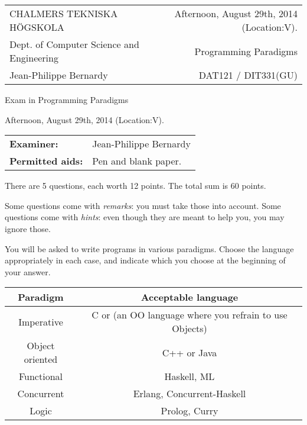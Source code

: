\documentclass{article}
\begin{document}
\setlength{\parskip}{2pt}

\newcommand{\examtime}{Afternoon, August 29th, 2014  (Location:V)}
\newcommand{\points}[1]{\marginpar{\bf #1 points}}
\noindent
\begin{tabular}{lr}
CHALMERS TEKNISKA H\"OGSKOLA &\examtime{}.\\
Dept. of Computer Science and Engineering & Programming Paradigms\\
Jean-Philippe Bernardy                 & DAT121 / DIT331(GU) \\
\end{tabular}

\vspace{2.5cm} \noindent
\begin{center} {\LARGE
Exam in Programming Paradigms}
\end{center}

\vspace{1.5cm}

\noindent
\examtime{}.\\
\begin{tabular}{ll}
\textbf{Examiner:} & Jean-Philippe Bernardy \\
\textbf{Permitted aids:} & Pen and blank paper.
\end{tabular}
\vspace{1cm}

\noindent

There are 5 questions, each worth 12 points. The total sum is 60
points.

Some questions come with \emph{remarks}: you must take those
into account.
Some questions come with \emph{hints}: even though they are meant to help you, you may ignore those.

You will be asked to write programs in various paradigms. Choose the
language appropriately in each case, and indicate which you choose at
the beginning of your answer.

\begin{tabular}[p]{cc}
  Paradigm & Acceptable language \\ \hline
  Imperative   & C or (an OO language where you refrain to use Objects) \\
  Object oriented & C++ or Java \\
  Functional & Haskell, ML \\
  Concurrent & Erlang, Concurrent-Haskell \\
  Logic & Prolog, Curry
\end{tabular}
\end{document}
